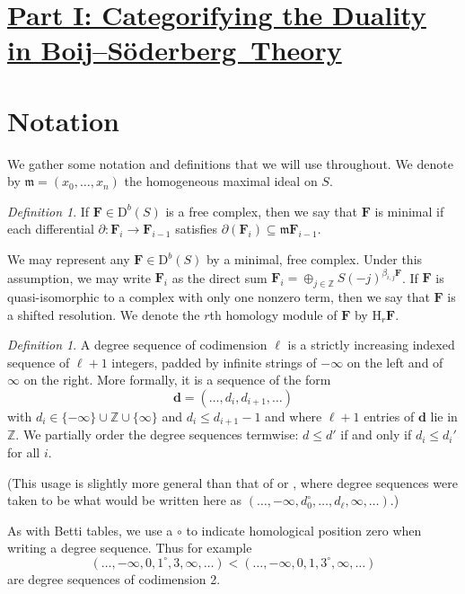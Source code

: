 \documentclass[12pt]{amsart}
\theoremstyle{definition}
\theoremstyle{remark}
\newtheorem{defn}[lemma]{Definition}
\newcommand{\HH}{\mathrm{H}}
\newcommand{\ZZ}{\mathbb{Z}}
\newcommand{\dd}{\mathbf{d}}
\newcommand{\FF}{\mathbf{F}}
\newcommand{\defi}[1]{\textsf{#1}} %
\newcommand{\zp}{\circ}
\newcommand{\DD}{\mathrm{D}}
\def\BS{Boij--S\"oderberg~}
\begin{document}
\section*{\underline{{Part I: Categorifying the Duality in \BS Theory}}}
\section{Notation}\label{sec:notation}
We gather some notation and definitions that we will use throughout.  We denote by  $\mathfrak m=(x_0, \dots, x_n)$ the homogeneous maximal ideal on $S$.
\begin{defn}
If $\FF\in \DD^b(S)$ is a free complex, then we say that $\FF$ is \defi{minimal} if each differential $\partial: \FF_i\to \FF_{i-1}$ satisfies $\partial(\FF_i)\subseteq \mathfrak m\FF_{i-1}$.
\end{defn}
We may represent any $\FF\in \DD^b(S)$ by a minimal, free complex.  Under this assumption, we may write $\FF_i$ as the direct sum $\FF_i=\oplus_{j\in \ZZ} S(-j)^{\beta_{i,j}\FF}$.  If $\FF$ is quasi-isomorphic to a complex with only one nonzero term, then we say that $\FF$ is a \defi{shifted resolution}.  We denote the $r$th homology module of $\FF$ by $\HH_r\FF$.

\begin{defn}\label{def:deg seq}
A \defi{ degree sequence of codimension $\ell$} is a strictly increasing indexed sequence of $\ell+1$ 
integers, padded by  infinite strings of $-\infty$ on the left and of $\infty$ on the right. More formally,
it is a sequence of the form
\[{\dd}=(\dots, d_i, d_{i+1}, \dots)
\]
with  $d_{i} \in \{-\infty\}\cup \ZZ\cup \{\infty\}$ and $d_i \leq d_{i+1}-1$ and 
where  $\ell+1$ entries of $\dd$ lie in $\ZZ$. 
We partially order the degree sequences  termwise: $d\leq d'$ if and only if $d_i\leq d_i'$ for all $i$.
\end{defn}
(This usage is slightly more general than that of \cite{eis-schrey1} or \cite{boij-sod2}, where degree
sequences were taken to be what would be written here as
$(\dots,-\infty,d_{0}^{\zp},\dots,d_{\ell}, \infty,\dots)$.)

As with Betti tables, we use a $\zp$ to indicate homological position zero when writing a degree sequence. 
Thus for example
$$
(\dots, -\infty , 0, 1^{\circ}, 3, \infty, \dots) < (\dots, -\infty , 0, 1, 3^{\circ}, \infty, \dots) 
$$
are  degree sequences of codimension 2.
\end{document}
